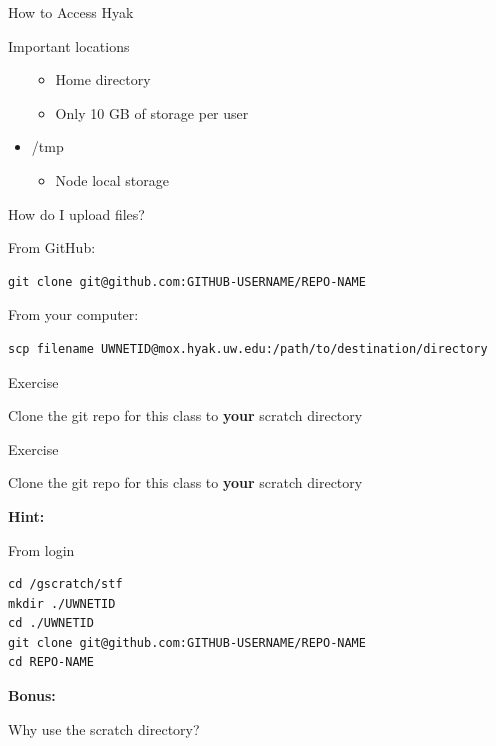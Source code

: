 \documentclass[ignorenonframetext,]{beamer}
\providecommand{\tightlist}{%
  \setlength{\itemsep}{0pt}\setlength{\parskip}{0pt}}
\begin{document}
\begin{frame}[fragile]{How to Access Hyak}
\begin{block}{Important locations}
\begin{itemize}[<+->]
  \begin{itemize}[<+->]
  \tightlist
  \item
    Home directory
  \item
    Only 10 GB of storage per user
  \end{itemize}
\item
  /tmp

  \begin{itemize}[<+->]
  \tightlist
  \item
    Node local storage
  \end{itemize}
\end{itemize}

\end{block}

\begin{block}{How do I upload files?}

From GitHub:

\begin{verbatim}
git clone git@github.com:GITHUB-USERNAME/REPO-NAME
\end{verbatim}

From your computer:

\begin{verbatim}
scp filename UWNETID@mox.hyak.uw.edu:/path/to/destination/directory
\end{verbatim}

\end{block}

\begin{block}{Exercise}

Clone the git repo for this class to \textbf{your} scratch directory

\end{block}

\begin{block}{Exercise}

Clone the git repo for this class to \textbf{your} scratch directory

\textbf{Hint:}

From login

\begin{verbatim}
cd /gscratch/stf
mkdir ./UWNETID
cd ./UWNETID
git clone git@github.com:GITHUB-USERNAME/REPO-NAME
cd REPO-NAME
\end{verbatim}

\textbf{Bonus:}

Why use the scratch directory?

\end{block}


\end{frame}
\end{document}
